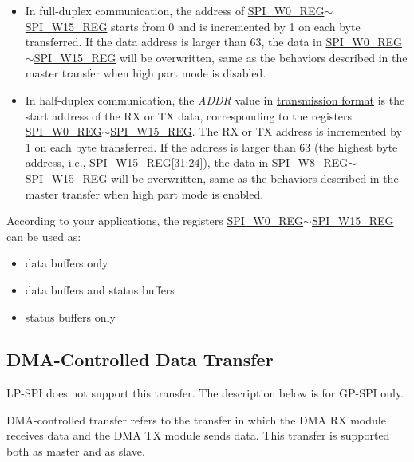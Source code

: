 \documentclass[main\_\_EN.tex]{subfiles}
\begin{document}
\begin{itemize}
    \item In full-duplex communication, the address of \hyperref[regdesc:SPIW0REG]{SPI\_W0\_REG}$\sim$\hyperref[regdesc:SPIW0REG]{SPI\_W15\_REG} starts from 0 and is incremented by 1 on each byte transferred. If the data address is larger than 63, the data in \hyperref[regdesc:SPIW0REG]{SPI\_W0\_REG}$\sim$\hyperref[regdesc:SPIW0REG]{SPI\_W15\_REG} will be overwritten, same as the behaviors described in the master transfer when high part mode is disabled.
    \item In half-duplex communication, the \emph{ADDR} value in \hyperref[slave communication format]{transmission format} is the start address of the RX or TX data, corresponding to the registers \hyperref[regdesc:SPIW0REG]{SPI\_W0\_REG}$\sim$\hyperref[regdesc:SPIW0REG]{SPI\_W15\_REG}. The RX or TX address is incremented by 1 on each byte transferred. If the address is larger than 63 (the highest byte address, i.e., \hyperref[regdesc:SPIW0REG]{SPI\_W15\_REG}[31:24]), the data in \hyperref[regdesc:SPIW0REG]{SPI\_W8\_REG}$\sim$\hyperref[regdesc:SPIW0REG]{SPI\_W15\_REG} will be overwritten, same as the behaviors described in the master transfer when high part mode is enabled.
\end{itemize}

According to your applications, the registers \hyperref[regdesc:SPIW0REG]{SPI\_W0\_REG}$\sim$\hyperref[regdesc:SPIW15REG]{SPI\_W15\_REG} can be used as:
\begin{itemize}
    \item data buffers only
    \item data buffers and status buffers
    \item status buffers only
\end{itemize}


\subsection{DMA-Controlled Data Transfer}\label{sec:usage-of-gp-spi2-dma-controlled-mode}
\vspace{2em}
\begin{tiplisting}
    LP-SPI does not support this transfer. The description below is for GP-SPI only.
\end{tiplisting}

DMA-controlled transfer refers to the transfer in which the DMA RX module receives data and the DMA TX  module sends data. This transfer is supported both as master and as slave.
\end{document}

